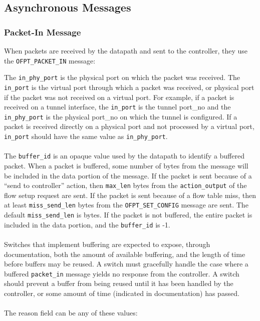 \subsection{Asynchronous Messages}
\subsubsection{Packet-In Message}
When packets are received by the datapath and sent to the controller, they use the \verb|OFPT_PACKET_IN| message:


The \verb|in_phy_port| is the physical port on which the packet was received. The \verb|in_port| is the virtual port through which a packet was received, or physical port if the packet was not received on a virtual port.  For example, if a packet is received on a tunnel interface, the \verb|in_port| is the tunnel port\_no and the \verb|in_phy_port| is the physical port\_no on which the tunnel is configured. If a packet is received directly on a physical port and not processed by a virtual port, \verb|in_port| should have the same value as \verb|in_phy_port|.
\\\\
The \verb|buffer_id| is an opaque value used by the datapath to identify a buffered packet.  When a packet is buffered, some number of bytes from the message will be included in the data portion of the message.  If the packet is sent because of a ``send to controller'' action, then \verb|max_len| bytes from the \verb|action_output| of the flow setup request are sent.  If the packet is sent because of a flow table miss, then at least \verb|miss_send_len| bytes from the \verb|OFPT_SET_CONFIG| message are sent.  The default \verb|miss_send_len| is bytes.  If the packet is not buffered, the entire packet is included in the data portion, and the \verb|buffer_id| is -1.  
\\\\
Switches that implement buffering are expected to expose, through documentation, both the amount of available buffering, and the length of time before buffers may be reused.  A switch must gracefully handle the case where a buffered \verb|packet_in| message yields no response from the controller.  A switch should prevent a buffer from being reused until it has been handled by the controller, or some amount of time (indicated in documentation) has passed.
\\\\
The reason field can be any of these values:


